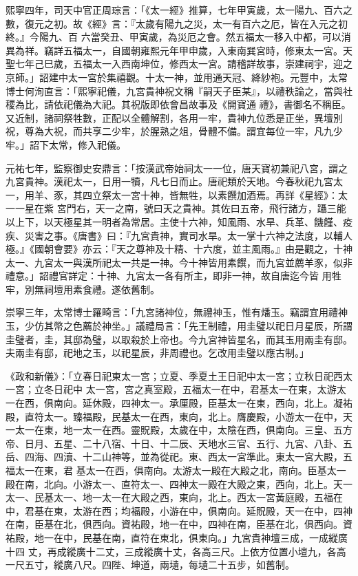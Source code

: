 \begin{pinyinscope}
 熙寧四年，司天中官正周琮言：「《太一經》推算，七年甲寅歲，太一陽九、百六之數，復元之初。故《經》言：『太歲有陽九之災，太一有百六之厄，皆在入元之初終。』今陽九、百
 六當癸丑、甲寅歲，為災厄之會。然五福太一移入中都，可以消異為祥。竊詳五福太一，自國朝雍熙元年甲申歲，入東南巽宮時，修東太一宮。天聖七年己巳歲，五福太一入西南坤位，修西太一宮。請稽詳故事，崇建祠宇，迎之京師。」詔建中太一宮於集禧觀。十太一神，並用通天冠、絳紗袍。元豐中，太常博士何洵直言：「熙寧祀儀，九宮貴神祝文稱『嗣天子臣某』，以禮秩論之，當與社稷為比，請依祀儀為大祀。其祝版即依會昌故事及《開寶通
 禮》，書御名不稱臣。又近制，諸祠祭牲數，正配以全體解割，各用一牢，貴神九位悉是正坐，異壇別祝，尊為大祝，而共享二少牢，於腥熟之俎，骨體不備。謂宜每位一牢，凡九少牢。」詔下太常，修入祀儀。



 元祐七年，監察御史安鼎言：「按漢武帝始祠太一一位，唐天寶初兼祀八宮，謂之九宮貴神。漢祀太一，日用一犢，凡七日而止。唐祀類於天地。今春秋祀九宮太一，用羊、豕，其四立祭太一宮十神，皆無牲，以素饌加酒焉。再詳《星經》：太一一星在紫
 宮門右，天一之南，號曰天之貴神。其佐曰五帝，飛行諸方，躡三能以上下，以天極星其一明者為常居。主使十六神，知風雨、水旱、兵革、饑饉、疫疾、災害之事。《唐書》曰：『九宮貴神，實司水旱。太一掌十六神之法度，以輔人極。』《國朝會要》亦云：『天之尊神及十精、十六度，並主風雨。』由是觀之，十神太一、九宮太一與漢所祀太一共是一神。今十神皆用素饌，而九宮並薦羊豕，似非禮意。」詔禮官詳定：十神、九宮太一各有所主，即非一神，故自唐迄今皆
 用牲牢，別無祠壇用素食禮。遂依舊制。



 崇寧三年，太常博士羅畸言：「九宮諸神位，無禮神玉，惟有燔玉。竊謂宜用禮神玉，少仿其幣之色薦於神坐。」議禮局言：「先王制禮，用圭璧以祀日月星辰，所謂圭璧者，圭，其邸為璧，以取殺於上帝也。今九宮神皆星名，而其玉用兩圭有邸。夫兩圭有邸，祀地之玉，以祀星辰，非周禮也。乞改用圭璧以應古制。」



 《政和新儀》：「立春日祀東太一宮；立夏、季夏土王日祀中太一宮；立秋日祀西太一宮；立冬日祀中
 太一宮，宮之真室殿，五福太一在中，君基太一在東，太游太一在西，俱南向。延休殿，四神太一。承厘殿，臣基太一在東，西向，北上。凝祐殿，直符太一。臻福殿，民基太一在西，東向，北上。膺慶殿，小游太一在中，天一太一在東，地一太一在西。靈貺殿，太歲在中，太陰在西，俱南向。三皇、五方帝、日月、五星、二十八宿、十日、十二辰、天地水三官、五行、九宮、八卦、五岳、四海、四瀆、十二山神等，並為從祀。東、西太一宮準此。東太一宮大殿，五福太一在東，君
 基太一在西，俱南向。太游太一殿在大殿之北，南向。臣基太一殿在南，北向。小游太一、直符太一、四神太一殿在大殿之東，西向，北上。天一太一、民基太一、地一太一在大殿之西，東向，北上。西太一宮黃庭殿，五福在中，君基在東，太游在西；均福殿，小游在中，俱南向。延貺殿，天一在中，四神在南，臣基在北，俱西向。資祐殿，地一在中，四神在南，臣基在北，俱西向。資祐殿，地一在中，民基在南，直符在東北，俱東向。」九宮貴神壇三成，一成縱廣十四
 丈，再成縱廣十二丈，三成縱廣十丈，各高三尺。上依方位置小壇九，各高一尺五寸，縱廣八尺。四陛、坤道，兩壝，每壝二十五步，如舊制。




\end{pinyinscope}
